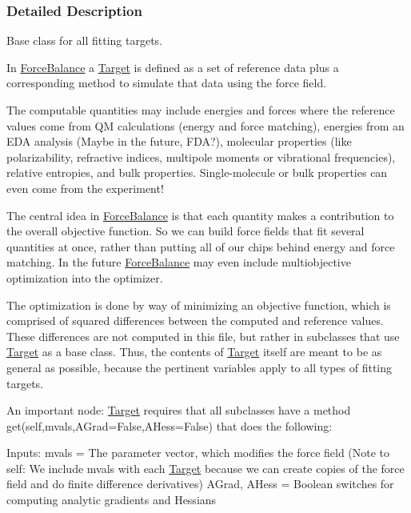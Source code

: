 \subsubsection{Detailed Description}
Base class for all fitting targets. 

In \hyperlink{namespaceForceBalance}{Force\+Balance} a \hyperlink{classsrc_1_1target_1_1Target}{Target} is defined as a set of reference data plus a corresponding method to simulate that data using the force field.

The \textquotesingle{}computable quantities\textquotesingle{} may include energies and forces where the reference values come from QM calculations (energy and force matching), energies from an E\+DA analysis (Maybe in the future, F\+DA?), molecular properties (like polarizability, refractive indices, multipole moments or vibrational frequencies), relative entropies, and bulk properties. Single-\/molecule or bulk properties can even come from the experiment!

The central idea in \hyperlink{namespaceForceBalance}{Force\+Balance} is that each quantity makes a contribution to the overall objective function. So we can build force fields that fit several quantities at once, rather than putting all of our chips behind energy and force matching. In the future \hyperlink{namespaceForceBalance}{Force\+Balance} may even include multiobjective optimization into the optimizer.

The optimization is done by way of minimizing an \textquotesingle{}objective function\textquotesingle{}, which is comprised of squared differences between the computed and reference values. These differences are not computed in this file, but rather in subclasses that use \hyperlink{classsrc_1_1target_1_1Target}{Target} as a base class. Thus, the contents of \hyperlink{classsrc_1_1target_1_1Target}{Target} itself are meant to be as general as possible, because the pertinent variables apply to all types of fitting targets.

An important node\+: \hyperlink{classsrc_1_1target_1_1Target}{Target} requires that all subclasses have a method get(self,mvals,A\+Grad=False,A\+Hess=False) that does the following\+:

Inputs\+: mvals = The parameter vector, which modifies the force field (Note to self\+: We include mvals with each \hyperlink{classsrc_1_1target_1_1Target}{Target} because we can create copies of the force field and do finite difference derivatives) A\+Grad, A\+Hess = Boolean switches for computing analytic gradients and Hessians

